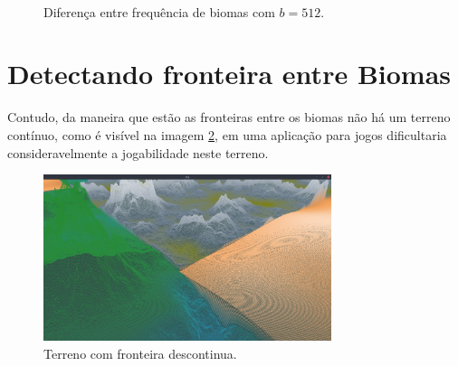\begin{figure}[H]
     \centering
     \hspace{0.1cm}
     \\
     \caption{Diferença entre frequência de biomas com $b = 512$.}
     
     \label{fig:biomeareasanotherCompx}
\end{figure}

\section{Detectando fronteira entre Biomas}

Contudo, da maneira que estão as fronteiras entre os biomas não há um terreno
contínuo, como é visível na imagem \ref{fig:descontinuos}, em uma aplicação para jogos
dificultaria consideravelmente
a jogabilidade neste terreno. %

\begin{figure}[H]
    \centering
    \includegraphics[width=0.75\textwidth]{figuras/descontinuos.png}
    \caption{Terreno com fronteira descontinua.}
    \label{fig:descontinuos}
\end{figure}

